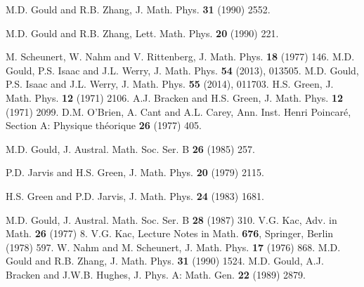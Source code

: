 \documentclass[12pt]{article}
\begin{document}
\begin{thebibliography}{10}

 M.D. Gould and R.B. Zhang, J. Math. Phys. {\bf 31} (1990) 2552.

 M.D. Gould and R.B. Zhang, Lett. Math. Phys. {\bf 20} (1990) 221.

 M. Scheunert, W. Nahm and V. Rittenberg, J. Math. Phys. {\bf 18} (1977) 146. 
% 
 M.D. Gould, P.S. Isaac and J.L. Werry, J. Math. Phys. {\bf 54} (2013), 013505.
% 
 M.D. Gould, P.S. Isaac and J.L. Werry, J. Math. Phys. {\bf 55} (2014), 011703.
% 
 H.S. Green, J. Math. Phys. {\bf 12} (1971) 2106.
%  
 A.J. Bracken and H.S. Green, J. Math. Phys. {\bf 12} (1971) 2099.
%  
% 
 D.M. O'Brien, A. Cant and A.L. Carey, Ann. Inst. Henri 
Poincar\'e, Section A: Physique th\'eorique {\bf 26} (1977) 405.
  
 M.D. Gould, J. Austral. Math. Soc. Ser. B {\bf 26}  (1985) 257.

 P.D. Jarvis and H.S. Green, J. Math. Phys.  {\bf 20}  (1979) 2115.
 
  H.S. Green and P.D. Jarvis, J. Math. Phys.  {\bf 24}  (1983) 1681.
  
  M.D. Gould, J. Austral. Math. Soc. Ser. B {\bf 28}  (1987) 310.
%  
%  
%  
%  
%  
% 
% 
% 
%  
 V.G. Kac, Adv. in Math. {\bf 26} (1977) 8.
% 
 V.G. Kac, Lecture Notes in Math. {\bf 676}, Springer, Berlin (1978) 597.
% 
 W. Nahm and M. Scheunert, J. Math. Phys. {\bf 17} (1976) 868.
% 
 M.D. Gould and R.B. Zhang, J. Math. Phys. {\bf 31} (1990) 1524.
% 
 M.D. Gould, A.J. Bracken and J.W.B. Hughes, J. Phys. A: Math. Gen.
{\bf 22} (1989) 2879.
 

\end{thebibliography}
\end{document}

